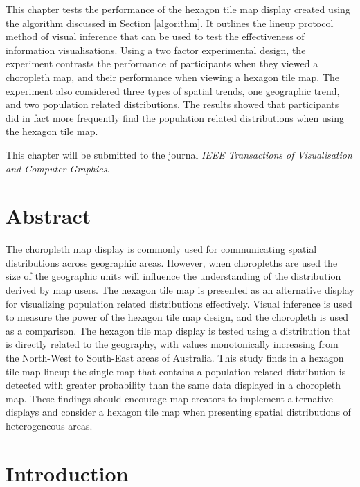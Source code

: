 \documentclass{monashthesis}
\begin{document}
This chapter tests the performance of the hexagon tile map display created using the algorithm discussed in Section \ref{algorithm}.
It outlines the lineup protocol method of visual inference that can be used to test the effectiveness of information visualisations.
Using a two factor experimental design, the experiment contrasts the performance of participants when they viewed a choropleth map, and their performance when viewing a hexagon tile map.
The experiment also considered three types of spatial trends, one geographic trend, and two population related distributions.
The results showed that participants did in fact more frequently find the population related distributions when using the hexagon tile map.

This chapter will be submitted to the journal \emph{IEEE Transactions of Visualisation and Computer Graphics}.

\hypertarget{abstract-3}{%
\section*{Abstract}\label{abstract-3}}

The choropleth map display is commonly used for communicating spatial distributions across geographic areas. However, when choropleths are used the size of the geographic units will influence the understanding of the distribution derived by map users. The hexagon tile map is presented as an alternative display for visualizing population related distributions effectively. Visual inference is used to measure the power of the hexagon tile map design, and the choropleth is used as a comparison. The hexagon tile map display is tested using a distribution that is directly related to the geography, with values monotonically increasing from the North-West to South-East areas of Australia. This study finds in a hexagon tile map lineup the single map that contains a population related distribution is detected with greater probability than the same data displayed in a choropleth map. These findings should encourage map creators to implement alternative displays and consider a hexagon tile map when presenting spatial distributions of heterogeneous areas.

\hypertarget{introduction-2}{%
\section{Introduction}\label{introduction-2}}
\end{document}
